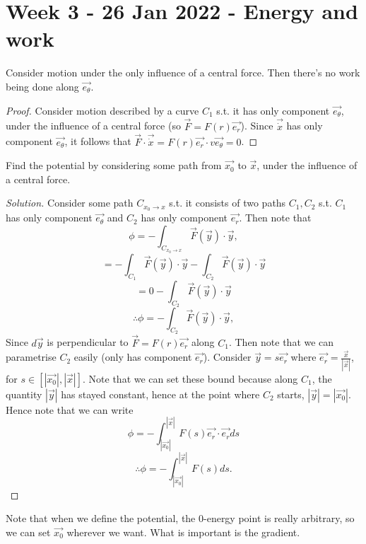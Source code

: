 \section{Week 3 - 26 Jan 2022 - Energy and work}
\begin{proposition}
  Consider motion under the only influence of a central force. Then there's no
  work being done along $\vec{e_{\theta}}$.
  \label{prop:eThetaWorkInCentralField}
\end{proposition}
\begin{proof}
  Consider motion described by a curve $C_1$ s.t. it has only component
  $\vec{e_{\theta}}$, under the influence of a central force (so
  $\vec{F}=F(r)\vec{e_r}$). Since $\vec{\dot{x}}$ has only component
  $\vec{e_{\theta}}$, it follows that $\vec{F}\cdot
  \vec{\dot{x}}=F(r)\vec{e_r}\cdot v\vec{e_{\theta}}=0$.
\end{proof}

\begin{example}
  Find the potential by considering some path from $\vec{x_0}$ to $\vec{x}$,
  under the influence of a central force.
\end{example}
\begin{proof}[Solution]
  Consider some path $C_{x_0\to x}$ s.t. it consists of two paths $C_1, C_2$
  s.t. $C_1$ has only component $\vec{e_{\theta}}$ and $C_2$ has only component
  $\vec{e_r}$. Then note that
  \[\phi =-\int_{C_{x_0\to x}} \vec{F}(\vec{y})\cdot\vec{y},\]
  \[ = -\int_{C_1}\vec{F}(\vec{y})\cdot\vec{y} -
  \int_{C_2}\vec{F}(\vec{y})\cdot\vec{y}\]
  \[= 0-\int_{C_2}\vec{F}(\vec{y})\cdot\vec{y}\]
  \[\therefore \phi = -\int_{C_2}\vec{F}(\vec{y})\cdot\vec{y},\]
  Since $d\vec{y}$ is perpendicular to $\vec{F}=F(r)\vec{e_r}$ along $C_1$. Then
  note that we can parametrise $C_2$ easily (only has component $\vec{e_r}$).
  Consider $\vec{y}=s\vec{e_r}$ where $\vec{e_r}=\frac{\vec{x}}{|\vec{x}|}$, for
  $s\in [|\vec{x_0}|,|\vec{x}|]$. Note that we can set these bound because along
  $C_1$, the quantity $|\vec{y}|$ has stayed constant, hence at the point where
  $C_2$ starts, $|\vec{y}|=|\vec{x_0}|$. Hence note that we can write 
  \[\phi = -\int_{|\vec{x_0}|}^{|\vec{x}|} F(s)\vec{e_r}\cdot\vec{e_r}ds\]
  \[\therefore \phi= -\int_{|\vec{x_0}|}^{|\vec{x}|} F(s)ds.\]
\end{proof}
\begin{remark}
  Note that when we define the potential, the $0$-energy point is really
  arbitrary, so we can set $\vec{x_0}$ wherever we want. What is important is
  the gradient.
\end{remark}

